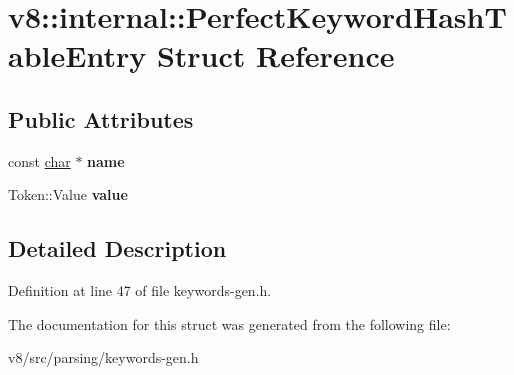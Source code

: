 \hypertarget{structv8_1_1internal_1_1PerfectKeywordHashTableEntry}{}\section{v8\+:\+:internal\+:\+:Perfect\+Keyword\+Hash\+Table\+Entry Struct Reference}
\label{structv8_1_1internal_1_1PerfectKeywordHashTableEntry}
\subsection*{Public Attributes}
\begin{DoxyCompactItemize}
\item 
\mbox{\label{structv8_1_1internal_1_1PerfectKeywordHashTableEntry_a08c5c03c95abc2ef41a2d9be210b6893}} 
const \mbox{\hyperlink{classchar}{char}} $\ast$ {\bfseries name}
\item 
\mbox{\label{structv8_1_1internal_1_1PerfectKeywordHashTableEntry_ad04bdbbe7bf565f87ade18e0ec0ce380}} 
Token\+::\+Value {\bfseries value}
\end{DoxyCompactItemize}


\subsection{Detailed Description}


Definition at line 47 of file keywords-\/gen.\+h.



The documentation for this struct was generated from the following file\+:\begin{DoxyCompactItemize}
\item 
v8/src/parsing/keywords-\/gen.\+h\end{DoxyCompactItemize}

